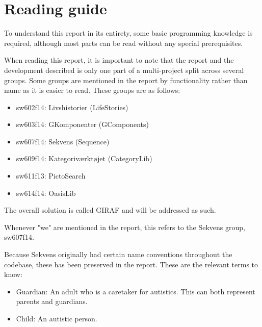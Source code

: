 \section*{Reading guide}

To understand this report in its entirety, some basic programming knowledge is required, although most parts can be read without any special prerequisites.

When reading this report, it is important to note that the report and the development described is only one part of a multi-project split across several groups. Some groups are mentioned in the report by functionality rather than name as it is easier to read. These groups are as follows:

\begin{itemize}
\item sw602f14: Livshistorier (LifeStories)
\item sw603f14: GKomponenter (GComponents)
\item sw607f14: Sekvens (Sequence)
\item sw609f14: Kategoriværktøjet (CategoryLib)
\item sw611f13: PictoSearch
\item sw614f14: OasisLib
\end{itemize}

The overall solution is called GIRAF and will be addressed as such.

Whenever "we" are mentioned in the report, this refers to the Sekvens group, sw607f14.

Because Sekvens originally had certain name conventions throughout the codebase, these has been preserved in the report. These are the relevant terms to know:

\begin{itemize}
\item Guardian: An adult who is a caretaker for autistics. This can both represent parents and guardians.
\item Child: An autistic person.
\end{itemize}